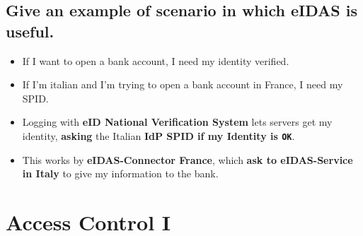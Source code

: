 \documentclass[9pt, letterpaper]{article}
\begin{document}
\subsection{Give an example of scenario in which eIDAS is useful.}
\begin{itemize}
	\item If I want to open a bank account, I need my identity verified.
	\item If I'm italian and I'm trying to open a bank account in France, I need my SPID.
	\item Logging with \textbf{eID National Verification System} lets servers get my identity, \textbf{asking} the Italian \textbf{IdP SPID if my Identity is {\tt OK}}.
	\item This works by \textbf{eIDAS-Connector France}, which \textbf{ask to eIDAS-Service in Italy} to give my information to the bank.
\end{itemize}

\newpage

\section{Access Control I}
\end{document}
